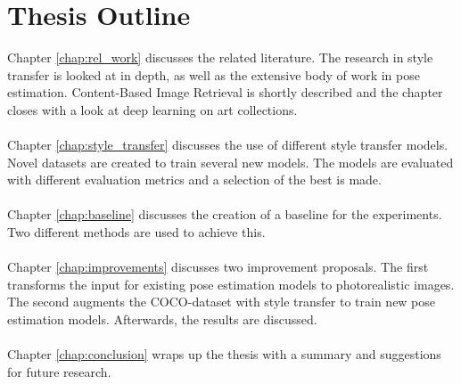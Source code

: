 \section{Thesis Outline}
Chapter \ref{chap:rel_work} discusses the related literature.
The research in style transfer is looked at in depth, as well as the extensive body of work in pose estimation.
Content-Based Image Retrieval is shortly described and the chapter closes with a look at deep learning on art collections.
\\
\\
Chapter \ref{chap:style_transfer} discusses the use of different style transfer models.
Novel datasets are created to train several new models.
The models are evaluated with different evaluation metrics and a selection of the best is made.
\\
\\
Chapter \ref{chap:baseline} discusses the creation of a baseline for the experiments.
Two different methods are used to achieve this.
\\
\\
Chapter \ref{chap:improvements} discusses two improvement proposals.
The first transforms the input for existing pose estimation models to photorealistic images.
The second augments the COCO-dataset with style transfer to train new pose estimation models.
Afterwards, the results are discussed.
\\
\\
Chapter \ref{chap:conclusion} wraps up the thesis with a summary and suggestions for future research.
